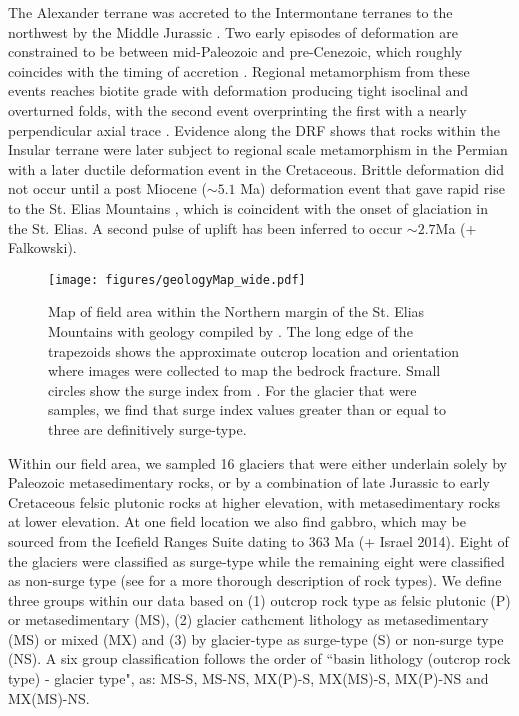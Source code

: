 \documentclass[review]{igs}
\begin{document}
The Alexander terrane was accreted to the Intermontane terranes to the northwest by the Middle Jurassic \citep{Heyden1992}. Two early episodes of deformation are constrained to be between mid-Paleozoic and pre-Cenezoic, which roughly coincides with the timing of accretion \citep{Campbell1978}. Regional metamorphism from these events reaches biotite grade with deformation producing tight isoclinal and overturned folds, with the second event overprinting the first with a nearly perpendicular axial trace \citep{Campbell1978}. Evidence along the DRF shows that rocks within the Insular terrane were later subject to regional scale metamorphism in the Permian with a later ductile deformation event in the Cretaceous. Brittle deformation did not occur until a post Miocene ($\sim 5.1$ Ma) deformation event that gave rapid rise to the St. Elias Mountains \citep[e.g.][]{Eisbacher1977,Campbell1978}, which is coincident with the onset of glaciation in the St. Elias. A second pulse of uplift has been inferred to occur $\sim 2.7$Ma (+ Falkowski).

\begin{figure}[H]
  \centering
  \texttt{[image: figures/geologyMap\_wide.pdf]}
  \caption[]{Map of field area within the Northern margin of the St. Elias Mountains with geology compiled by \cite{Gordey1999}. The long edge of the trapezoids shows the approximate outcrop location and orientation where images were collected to map the bedrock fracture. Small circles show the surge index from \cite{Clarke1986}. For the glacier that were samples, we find that surge index values greater than or equal to three are definitively surge-type.}
\label{map}
\end{figure}


Within our field area, we sampled 16 glaciers that were either underlain solely by Paleozoic metasedimentary rocks, or by a combination of late Jurassic to early Cretaceous felsic plutonic rocks at higher elevation, with metasedimentary rocks at lower elevation. At one field location we also find gabbro, which may be sourced from the Icefield Ranges Suite dating to 363 Ma (+ Israel 2014). Eight of the glaciers were classified as surge-type while the remaining eight were classified as non-surge type (see \cite{Crompton2016} for a more thorough description of rock types). We define three groups within our data based on (1) outcrop rock type as felsic plutonic (P) or metasedimentary (MS), (2) glacier cathcment lithology as metasedimentary (MS) or mixed (MX) and (3) by glacier-type as surge-type (S) or non-surge type (NS). A six group classification follows the order of ``basin lithology (outcrop rock type) - glacier type", as: MS-S, MS-NS, MX(P)-S, MX(MS)-S, MX(P)-NS and MX(MS)-NS. 
\end{document}
